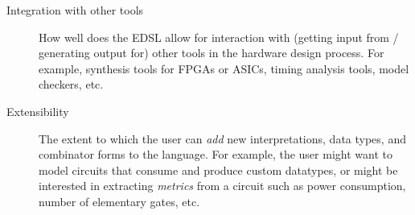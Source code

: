 \begin{description}
            \item[Integration with other tools] How well does the EDSL allow for interaction with
            (getting input from / generating output for) other tools in the hardware design process.
            For example, synthesis tools for FPGAs or ASICs, timing analysis tools, model checkers,
            etc.

            \item[Extensibility] The extent to which the user can \emph{add} new interpretations,
            data types, and combinator forms to the language. For example, the user might want to
            model circuits that consume and produce custom datatypes, or might be interested in
            extracting \emph{metrics} from a circuit such as power consumption, number of elementary
            gates, etc.
        \end{description}
